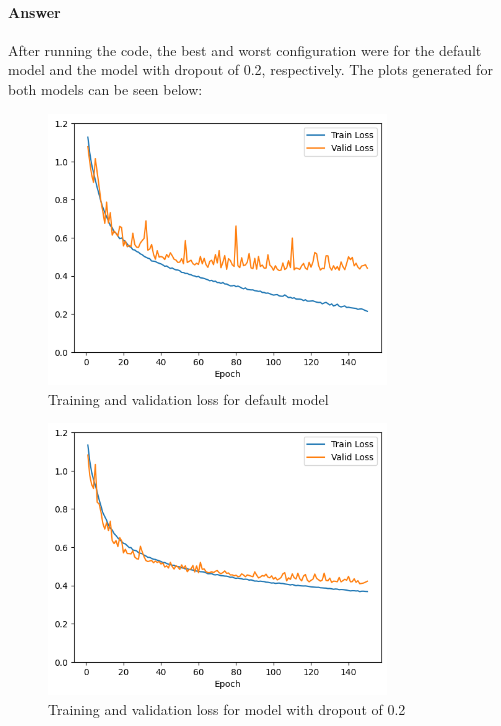 \documentclass{article}
\begin{document}
\paragraph{Answer} After running the code, the best and worst configuration were for the default model and the model with dropout of 0.2, respectively.
                    The plots generated for both models can be seen below:
\begin{figure}[H]
    \centering
    \includegraphics[width=0.8\textwidth]{"plots/mlp-training-loss-batch-256-lr-0.1-epochs-150-hidden-200-dropout-0.0-l2-0-layers-2-act-relu-opt-sgd.png"}
    \caption{Training and validation loss for default model}
    \label{2.2c default model}
\end{figure}

\begin{figure}[H]
    \centering
    \includegraphics[width=0.8\textwidth]{"plots/mlp-training-loss-batch-256-lr-0.1-epochs-150-hidden-200-dropout-0.2-l2-0-layers-2-act-relu-opt-sgd.png"}
    \caption{Training and validation loss for model with dropout of 0.2}
    \label{2.2c dropout 0.2}
\end{figure}
\end{document}
